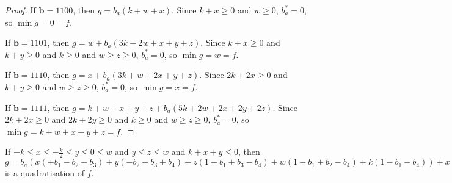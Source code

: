 \documentclass[11pt]{scrartcl}
\newcommand{\vc}[1]{\boldsymbol{#1}}
\begin{document}
\begin{proof}
If $\vc b = 1100$, then $g = b_a(k + w + x)$.
Since $k + x \ge 0$ and $w \ge 0$, $b_a^* = 0$, so $\min g = 0 = f$.

If $\vc b = 1101$, then $g = w + b_a(3k + 2w + x + y + z)$.
Since $k + x \ge 0 $ and $k + y \ge 0 $ and $k \ge 0 $ and $w \ge z \ge 0$, $b_a^* = 0$, so $\min g = w = f$.

If $\vc b = 1110$, then $g = x + b_a(3k + w + 2x + y + z)$.
Since $2k + 2x \ge 0$ and $k + y \ge 0$ and $w \ge z \ge 0$, $b_a^* = 0$, so $\min g = x = f$.

If $\vc b = 1111$, then $g = k + w + x + y + z + b_a(5k + 2w + 2x + 2y + 2z)$.
Since $2k + 2x \ge 0$ and $2k + 2y \ge 0$ and $k \ge 0$ and $w \ge z \ge 0$, $b_a^* = 0$, so $\min g = k + w + x + y + z = f$.

\end{proof}

\begin{lemma}
	\label{case4}
	If $-k\le x \le -\frac{k}{2} \le y \le 0 \le w$ and $y \le z \le w$ and $k+x+y \le 0$, then $g = b_a(x(+b_1-b_2-b_3)+y(-b_2-b_3+b_4)+z(1-b_1+b_3-b_4)+w(1-b_1+b_2-b_4)+k(1-b_1-b_4))+x(-b_1+b_1b_2+b_1b_3)+y(-b_4+b_2b_4+b_3b_4)+z(+b_1b_4)+w(+b_1b_4)+k(+b_1b_4)$ is a quadratisation of $f$.
 \end{lemma}
\end{document}
